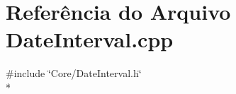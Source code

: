 \section{Referência do Arquivo Date\+Interval.\+cpp}
\label{_date_interval_8cpp}
{\ttfamily \#include \char`\"{}Core/\+Date\+Interval.\+h\char`\"{}}\\*
